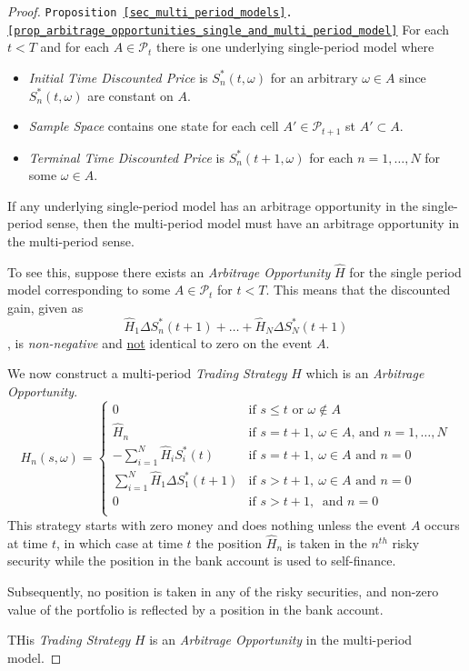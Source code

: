 \documentclass[11pt,a4paper]{article}
\begin{document}
  \begin{proof}{\texttt{Proposition \ref{sec_multi_period_models}.\ref{prop_arbitrage_opportunities_single_and_multi_period_model}}}
    For each $t<T$ and for each $A\in\mathcal{P}_t$ there is one underlying single-period model where
    \begin{itemize}
      \item \textit{Initial Time Discounted Price} is $S_n^*(t,\omega)$ for an arbitrary $\omega\in A$ since $S_n^*(t,\omega)$ are constant on $A$.
      \item \textit{Sample Space} contains one state for each cell $A'\in\mathcal{P}_{t+1}$ st $A'\subset A$.
      \item \textit{Terminal Time Discounted Price} is $S_n^*(t+1,\omega)$ for each $n=1,\dots,N$ for some $\omega\in A$.
    \end{itemize}
    If any underlying single-period model has an arbitrage opportunity in the single-period sense, then the multi-period model must have an arbitrage opportunity in the multi-period sense.
    \par To see this, suppose there exists an \textit{Arbitrage Opportunity} $\hat{H}$ for the single period model corresponding to some $A\in\mathcal{P}_t$ for $t<T$. This means that the discounted gain, given as
    \[ \hat{H}_1\Delta S_n^*(t+1)+\dots+\hat{H}_N\Delta S_N^*(t+1) \]
    , is \textit{non-negative} and \underline{not} identical to zero on the event $A$.
    \par We now construct a multi-period \textit{Trading Strategy} $H$ which is an \textit{Arbitrage Opportunity}.
    \[ H_n(s,\omega)=\begin{cases}
      0&\text{if }s\leq t\text{ or }\omega\not\in A\\
      \hat{H}_n&\text{if }s=t+1,\ \omega\in A\text{, and }n=1,\dots,N\\
      -\sum_{i=1}^N\hat{H}_iS_i^*(t)&\text{if }s=t+1,\ \omega\in A\text{ and }n=0\\
      \sum_{i=1}^N\hat{H}_1\Delta S_1^*(t+1)&\text{if }s>t+1,\ \omega\in A\text{ and }n=0\\
      0&\text{if }s>t+1,\ \text{ and }n=0\\
    \end{cases} \]
    This strategy starts with zero money and does nothing unless the event $A$ occurs at time $t$, in which case at time $t$ the position $\hat{H}_n$ is taken in the $n^{th}$ risky security while the position in the bank account is used to self-finance.
    \par Subsequently, no position is taken in any of the risky securities, and non-zero value of the portfolio is reflected by a position in the bank account.
    \par THis \textit{Trading Strategy} $H$ is an \textit{Arbitrage Opportunity} in the multi-period model.\proved
  \end{proof}
\end{document}

